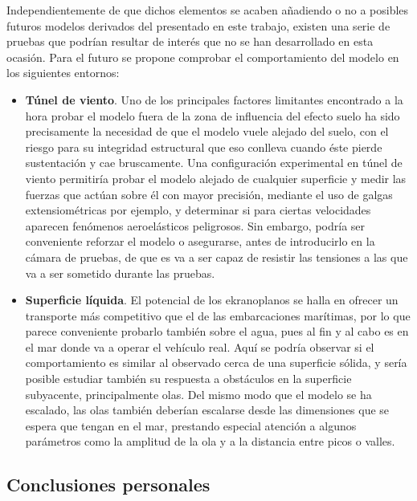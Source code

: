 Independientemente de que dichos elementos se acaben añadiendo o no a posibles futuros modelos derivados del presentado en este trabajo, existen una serie de pruebas que podrían resultar de interés que no se han desarrollado en esta ocasión. Para el futuro se propone comprobar el comportamiento del modelo en los siguientes entornos:
\begin{itemize}
\item \textbf{Túnel de viento}. Uno de los principales factores limitantes encontrado a la hora probar el modelo fuera de la zona de influencia del efecto suelo ha sido precisamente la necesidad de que el modelo vuele alejado del suelo, con el riesgo para su integridad estructural que eso conlleva cuando éste pierde sustentación y cae bruscamente. Una configuración experimental en túnel de viento permitiría probar el modelo alejado de cualquier superficie y medir las fuerzas que actúan sobre él con mayor precisión, mediante el uso de galgas extensiométricas por ejemplo, y determinar si para ciertas velocidades aparecen fenómenos aeroelásticos peligrosos. Sin embargo, podría ser conveniente reforzar el modelo o asegurarse, antes de introducirlo en la cámara de pruebas, de que es va a ser capaz de resistir las tensiones a las que va a ser sometido durante las pruebas.
\item \textbf{Superficie líquida}. El potencial de los ekranoplanos se halla en ofrecer un transporte más competitivo que el de las embarcaciones marítimas, por lo que parece conveniente probarlo también sobre el agua, pues al fin y al cabo es en el mar donde va a operar el vehículo real. Aquí se podría observar si el comportamiento es similar al observado cerca de una superficie sólida, y sería posible estudiar también su respuesta a obstáculos en la superficie subyacente, principalmente olas. Del mismo modo que el modelo se ha escalado, las olas también deberían escalarse desde las dimensiones que se espera que tengan en el mar, prestando especial atención a algunos parámetros como la amplitud de la ola y a la distancia entre picos o valles.
\end{itemize}


\subsection{Conclusiones personales}
\label{sec:conclusions:personal}



